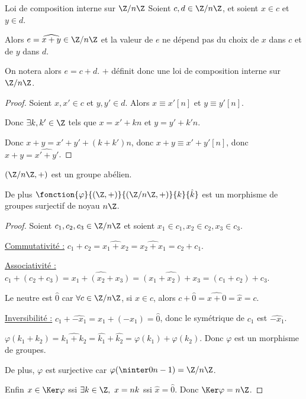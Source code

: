 \begin{proposition}{Loi de composition interne sur $\Z/n\Z$}{}
    Soient $c, d \in \Z/n\Z$, et soient $x \in c$ et $y \in d$. 

    Alors $e = \widehat{x + y} \in \Z/n \Z$ et la valeur de $e$ ne dépend pas du choix de $x$
    dans $c$ et de $y$ dans $d$.

    On notera alors $e = c + d$.
    $+$ définit donc une loi de composition interne sur $\Z/n\Z$.
\end{proposition}


\begin{proof}
    Soient $x, x' \in c$ et $y, y' \in d$.
    Alors $x \equiv x' [n]$ et $y \equiv y' [n]$.

    Donc $\exists k, k' \in \Z$ tels que $x = x' + kn$ et $y = y' + k'n$.

    Donc $x + y = x' + y' + (k + k')n$, donc $x + y \equiv x' + y' [n]$,
    donc $\widehat{x + y} = \widehat{x' + y'}$.
\end{proof}

\begin{theoreme}{}{}
    $(\Z/n\Z, +)$ est un groupe abélien.

    De plus $\fonction{\varphi}{(\Z, +)}{(\Z/n\Z, +)}{k}{\hat k}$ est un morphisme de groupes surjectif de noyau $n\Z$.
\end{theoreme}


\begin{proof}
    Soient $c_1, c_2, c_3 \in \Z/n\Z$ et soient $x_1 \in c_1, x_2 \in c_2, x_3 \in c_3$.

    \uline{Commutativité :} $c_1 + c_2 = \widehat{x_1 + x_2} = \widehat{x_2 + x_1} = c_2 + c_1$.

    \uline{Associativité :} $c_1 + (c_2 + c_3) = \widehat{x_1 + (x_2 + x_3)} = \widehat{(x_1 + x_2) + x_3} = (c_1 + c_2) + c_3$.

    \avspace Le neutre est $\hat 0$ car $\forall c \in \Z/n\Z$, si $x \in c$, alors
    $c + \hat 0 = \widehat{x + 0} = \hat x = c$.

    \avspace \uline{Inversibilité :} $c_1 + \hat{-x_1} = \widehat{x_1 + (-x_1)} = \hat 0$, donc le symétrique de $c_1$ est $\hat{-x_1}$.

    \avspace $\varphi(k_1 + k_2) = \widehat{k_1 + k_2} = \hat{k_1} + \hat{k_2} = \varphi(k_1) + \varphi(k_2)$.
    Donc $\varphi$ est un morphisme de groupes.

    De plus, $\varphi$ est surjective car $\varphi(\ninter 0 {n-1}) = \Z/n\Z$.

    Enfin $x \in \Ker \varphi$ ssi $\exists k \in \Z,~x = nk$ ssi $\hat x = \hat 0$.
    Donc $\Ker \varphi = n\Z$.
\end{proof}

